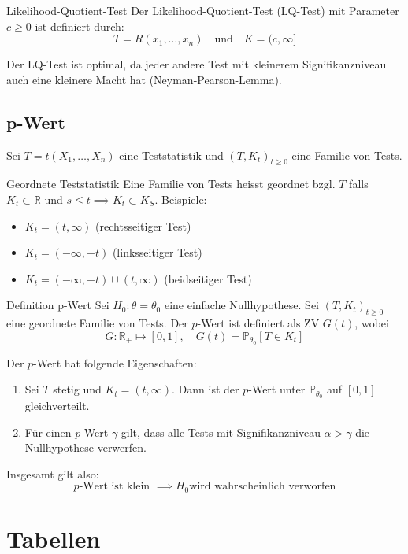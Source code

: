\documentclass[a4paper,10pt]{article}
\def\R{\mathbb{R}}
\def\P{\mathbb{P}}
\begin{document}
\begin{subbox}{Likelihood-Quotient-Test}
    Der Likelihood-Quotient-Test (LQ-Test) mit Parameter \(c \ge 0\) ist definiert durch:
    \[T = R(x_1, \ldots, x_n) \quad \text{und} \quad K = (c, \infty]\]
\end{subbox}
Der LQ-Test ist optimal, da jeder andere Test mit kleinerem Signifikanzniveau auch eine kleinere Macht hat (Neyman-Pearson-Lemma).

\subsection{p-Wert}
Sei \(T = t(X_1, \ldots, X_n)\) eine Teststatistik und \((T,K_t)_{t\ge 0}\) eine Familie von Tests.

\begin{subbox}{Geordnete Teststatistik}
    Eine Familie von Tests heisst geordnet bzgl. \(T\) falls \(K_t \subset \R\) und \(s \le t \implies K_t \subset K_S\). Beispiele:
    \begin{itemize}
        \item \(K_t = (t, \infty)\) (rechtsseitiger Test)
        \item \(K_t = (-\infty, -t)\) (linksseitiger Test)
        \item \(K_t = (-\infty, -t) \cup (t, \infty)\) (beidseitiger Test)
    \end{itemize}
\end{subbox}

\begin{mainbox}{Definition p-Wert}
    Sei \(H_0: \theta = \theta_0\) eine einfache Nullhypothese. Sei \((T, K_t)_{t\ge 0}\) eine geordnete Familie von Tests. Der \(p\)-Wert ist definiert als ZV \(G(t)\), wobei
    \[G: \R_+ \mapsto [0,1], \quad G(t) = \P_{\theta_0}[T \in K_t]\]
\end{mainbox}
Der \(p\)-Wert hat folgende Eigenschaften:
\begin{enumerate}
    \item Sei \(T\) stetig und \(K_t = (t, \infty)\). Dann ist der \(p\)-Wert unter \(\P_{\theta_0}\) auf \([0,1]\) gleichverteilt.
    \item Für einen \(p\)-Wert \(\gamma\) gilt, dass alle Tests mit Signifikanzniveau \(\alpha > \gamma\) die Nullhypothese verwerfen.
\end{enumerate}

Insgesamt gilt also:
\[p\text{-Wert ist klein } \implies H_0 \text{wird wahrscheinlich verworfen} \]

\section{Tabellen}
\end{document}
